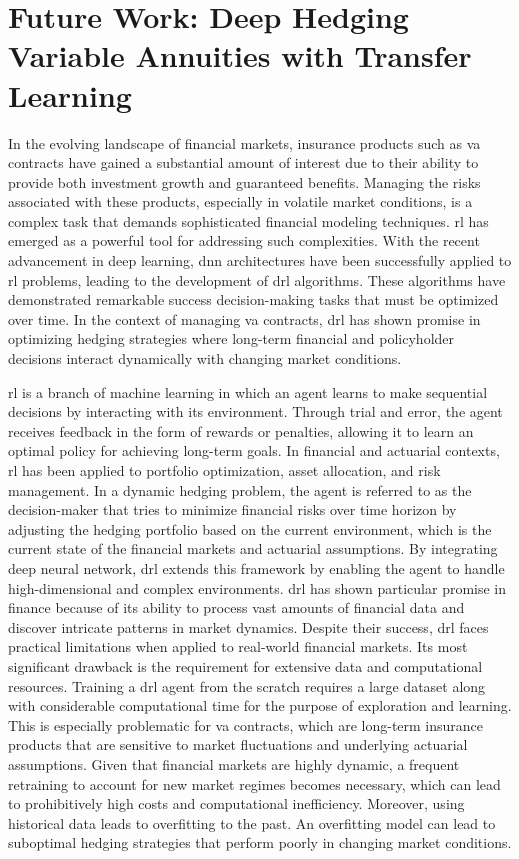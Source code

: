 \chapter{Future Work: Deep Hedging Variable Annuities with Transfer Learning} \label{chap:futureWork}

In the evolving landscape of financial markets, insurance products such as \gls{va} contracts have gained a substantial amount of interest due to their ability to provide both investment growth and guaranteed benefits. 
Managing the risks associated with these products, especially in volatile market conditions, is a complex task that demands sophisticated financial modeling techniques. 
\gls{rl} has emerged as a powerful tool for addressing such complexities. With the recent advancement in deep learning, \gls{dnn} architectures have been successfully applied to \gls{rl} problems, leading to the development of \gls{drl} algorithms. 
These algorithms have demonstrated remarkable success decision-making tasks that must be optimized over time. 
In the context of managing \gls{va} contracts, \gls{drl} has shown promise in optimizing hedging strategies where long-term financial and policyholder decisions interact dynamically with changing market conditions.

\gls{rl} is a branch of machine learning in which an agent learns to make sequential decisions by interacting with its environment. 
Through trial and error, the agent receives feedback in the form of rewards or penalties, allowing it to learn an optimal policy for achieving long-term goals. 
In financial and actuarial contexts, \gls{rl} has been applied to portfolio optimization, asset allocation, and risk management. 
In a dynamic hedging problem, the agent is referred to as the decision-maker that tries to minimize financial risks over time horizon by adjusting the hedging portfolio based on the current environment, which is the current state of the financial markets and actuarial assumptions.
By integrating deep neural network, \gls{drl} extends this framework by enabling the agent to handle high-dimensional and complex environments. 
\gls{drl} has shown particular promise in finance because of its ability to process vast amounts of financial data and discover intricate patterns in market dynamics.
Despite their success, \gls{drl} faces practical limitations when applied to real-world financial markets.
Its most significant drawback is the requirement for extensive data and computational resources.
Training a \gls{drl} agent from the scratch requires a large dataset along with considerable computational time for the purpose of exploration and learning.
This is especially problematic for \gls{va} contracts, which are long-term insurance products that are sensitive to market fluctuations and underlying actuarial assumptions.
Given that financial markets are highly dynamic, a frequent retraining to account for new market regimes becomes necessary, which can lead to prohibitively high costs and computational inefficiency.
Moreover, using historical data leads to overfitting to the past. 
An overfitting model can lead to suboptimal hedging strategies that perform poorly in changing market conditions.

